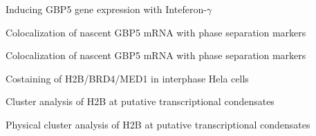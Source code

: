 \documentclass{beamer}					%
\begin{document}
\begin{frame}{Inducing GBP5 gene expression with Inteferon-$\gamma$}
\end{frame}

\begin{frame}{Colocalization of nascent GBP5 mRNA with phase separation markers}
\end{frame}

\begin{frame}{Colocalization of nascent GBP5 mRNA with phase separation markers}
\end{frame}

\begin{frame}{Costaining of H2B/BRD4/MED1 in interphase Hela cells}
\end{frame}

\begin{frame}{Cluster analysis of H2B at putative transcriptional condensates}
\end{frame}

\begin{frame}{Physical cluster analysis of H2B at putative transcriptional condensates}
\end{frame}
\end{document}
